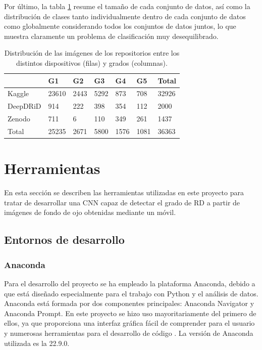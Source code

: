 Por último, la tabla \ref{tab:repositorios} resume el tamaño de cada conjunto de datos, así como la distribución de clases tanto individualmente dentro de cada conjunto de datos como globalmente considerando todos los conjuntos de datos juntos, lo que muestra claramente un problema de clasificación muy desequilibrado.

\begin{table}[]
\centering
\begin{tabular}{@{}llllll|l@{}}
\toprule
\rowcolor[HTML]{C0C0C0}
         & G1    & G2   & G3   & G4   & G5   & Total \\ \midrule
Kaggle   & 23610 & 2443 & 5292 & 873  & 708  & 32926 \\
DeepDRiD & 914   & 222  & 398  & 354  & 112  & 2000  \\
Zenodo   & 711   & 6    & 110  & 349  & 261  & 1437  \\ \midrule
Total    & 25235 & 2671 & 5800 & 1576 & 1081 & 36363 \\ \bottomrule
\end{tabular}
\caption{Distribución de las imágenes de los repositorios entre los distintos dispositivos (filas) y grados (columnas).}
\label{tab:repositorios}
\end{table}

\titlespacing{\section}{0pt}{0.25cm}{0.15cm}
\section{Herramientas}

En esta sección se describen las herramientas utilizadas en este proyecto para tratar de desarrollar una CNN capaz de detectar el grado de RD a partir de imágenes de fondo de ojo obtenidas mediante un móvil.

\subsection{Entornos de desarrollo}

\subsubsection{Anaconda}

Para el desarrollo del proyecto se ha empleado la plataforma Anaconda, debido a que está diseñado especialmente para el trabajo con Python y el análisis de datos. Anaconda está formada por dos componentes principales: Anaconda Navigator y Anaconda Prompt. En este proyecto se hizo uso mayoritariamente del primero de ellos, ya que proporciona una interfaz gráfica fácil de comprender para el usuario y numerosas herramientas para el desarrollo de código \cite{met:anaconda}. La versión de Anaconda utilizada es la 22.9.0.

